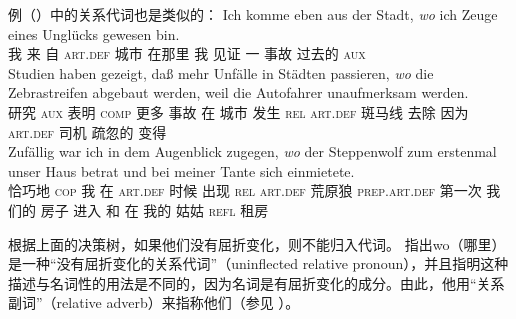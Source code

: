 例（）中的关系代词也是类似的：
\eal
\ex 
\gll Ich komme eben        aus der          Stadt, \emph{wo}    ich Zeuge eines Unglücks gewesen bin.\footnotemark\\
     我  来     \particle{} 自  \textsc{art}.\textsc{def} 城市   在那里 我  见证  一 事故 过去的 \textsc{aux} \\
\label{bsp-wo-ich-zeuge}
\ex 
\gll Studien haben    gezeigt, daß           mehr Unfälle in       Städten passieren, \emph{wo}    die   Zebrastreifen abgebaut werden, weil die Autofahrer unaufmerksam werden.\footnotemark\\
     研究 \textsc{aux} 表明     \textsc{comp} 更多 事故 在 城市    发生        \textsc{rel} \textsc{art}.\textsc{def} 斑马线  去除 \passiveprs{} 因为 \textsc{art}.\textsc{def} 司机 疏忽的 变得\\
\ex 
\gll Zufällig war ich in dem Augenblick zugegen, \emph{wo} der Steppenwolf zum erstenmal unser Haus betrat und bei meiner Tante sich einmietete.\footnotemark\\
     恰巧地 \textsc{cop} 我 在 \textsc{art}.\textsc{def} 时候 出现 \textsc{rel} \textsc{art}.\textsc{def} 荒原狼 \textsc{prep}.\textsc{art}.\textsc{def} 第一次 我们的 房子 进入 和 在 我的 姑姑 \textsc{refl} 租房\\

\zl

根据上面的决策树，如果他们没有屈折变化，则不能归入代词。 \citet[]{Eisenberg2004a} 指出wo（哪里）是一种“没有屈折变化的关系代词”（uninflected relative pronoun），并且指明这种描述与名词性的用法是不同的，因为名词是有屈折变化的成分。由此，他用“关系副词”（relative adverb）来指称他们（参见 ）。

